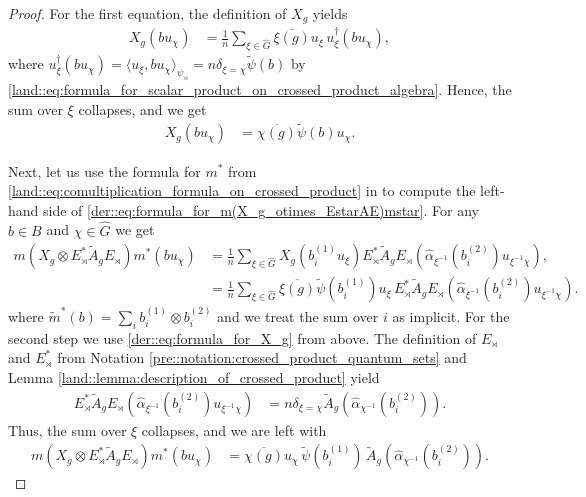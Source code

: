 \documentclass{amsart}
\theoremstyle{definition}
\theoremstyle{definition}
\begin{document}
\begin{proof}
    For the first equation, the definition of $X_g$ yields
    \begin{align*}
        X_g(b u_\chi) &= \frac{1}{n} \sum_{\xi \in \hat{G}} \overline{\xi(g)} u_\xi \, u_\xi^\dagger(b u_\chi),
    \end{align*}
    where $u_\xi^\dagger(b u_\chi) = \langle u_\xi, b u_\chi \rangle_{\psi_\rtimes} = n \delta_{\xi=\chi} \tilde{\psi}(b)$ by \eqref{land::eq:formula_for_scalar_product_on_crossed_product_algebra}. Hence, the sum over $\xi$ collapses, and we get
    \begin{align*}
        X_g(b u_\chi) &= \overline{\chi(g)} \tilde{\psi}(b) u_\chi.
    \end{align*}

    Next, let us use the formula for $m^\ast$ from \eqref{land::eq:comultiplication_formula_on_crossed_product} in  to compute the left-hand side of \eqref{der::eq:formula_for_m(X_g_otimes_EstarAE)mstar}. For any $b \in B$ and $\chi \in \hat{G}$ we get
    \begin{align*}
        m(X_g \otimes E_\rtimes^\ast \tilde{A}_g E_\rtimes) m^\ast(b u_\chi)
            &= \frac{1}{n} \sum_{\xi \in \hat{G}} X_g(b_i^{(1)} u_\xi) E_\rtimes^\ast \tilde{A}_g E_\rtimes(\hat{\alpha}_{\xi^{-1}}(b_i^{(2)}) u_{\xi^{-1} \chi}), \\
            &= \frac{1}{n} \sum_{\xi \in \hat{G}} \overline{\xi(g)} \tilde{\psi}(b_i^{(1)}) u_\xi \, E_\rtimes^\ast \tilde{A}_g E_\rtimes(\hat{\alpha}_{\xi^{-1}}(b_i^{(2)}) u_{\xi^{-1} \chi}).
    \end{align*}
    where $\tilde{m}^\ast(b) = \sum_i b_i^{(1)} \otimes b_i^{(2)}$ and we treat the sum over $i$ as implicit. For the second step we use \eqref{der::eq:formula_for_X_g} from above.
    The definition of $E_\rtimes$ and $E_\rtimes^\ast$ from Notation \ref{pre::notation:crossed_product_quantum_sets} and Lemma \ref{land::lemma:description_of_crossed_product} yield
    \begin{align*}
        E_\rtimes^\ast \tilde{A}_g E_\rtimes(\hat{\alpha}_{\xi^{-1}}(b_i^{(2)}) u_{\xi^{-1} \chi}) 
            &= n \delta_{\xi=\chi} \tilde{A}_g(\hat{\alpha}_{\chi^{-1}}(b_i^{(2)})).
    \end{align*}
    Thus, the sum over $\xi$ collapses, and we are left with
    \begin{align*}
        m(X_g \otimes E_\rtimes^\ast \tilde{A}_g E_\rtimes) m^\ast (b u_\chi) 
            &= \overline{\chi(g)} u_\chi \, \tilde{\psi}(b_i^{(1)}) \, \tilde{A}_g(\hat{\alpha}_{\chi^{-1}}(b_i^{(2)})).

\end{align*}
\end{proof}
\end{document}
